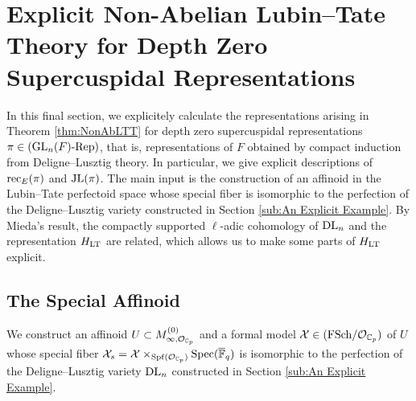 \documentclass[../main.tex]{subfiles}
\begin{document}
\section{Explicit Non-Abelian Lubin--Tate Theory for Depth Zero Supercuspidal
Representations} %
\label{sec:Explicit Non-Abelian Lubin-Tate Theory for Depth Zero Supercuspidal Representations}

In this final section, we explicitely calculate the representations
arising in Theorem \ref{thm:NonAbLTT} for depth zero supercuspidal
representations $\pi \in {({\operatorname{GL}_n(F)}\text-\allowbreak\mathrm{Rep})}$, that is, representations of $F$
obtained by compact induction from Deligne--Lusztig theory. In particular, 
we give explicit descriptions of $\mathrm{rec}_E(\pi)$ and $\mathrm{JL}(\pi)$. 
The main input is the construction of an affinoid in the Lubin--Tate perfectoid
space whose special fiber is isomorphic to the perfection of the 
Deligne--Lusztig variety constructed in Section \ref{sub:An Explicit Example}.
By Mieda's result, the compactly supported 
$\ell$-adic cohomology of $\mathrm{DL}_n$ and the representation $H_{\mathrm{LT}}$ are related,
which allows us to make some parts of $H_{\mathrm{LT}}$ explicit.

\subsection{The Special Affinoid} %
\label{sub:The Special Affinoid}
We construct an affinoid $U \subset M_{\infty,\mathcal{O}_{\mathbb{C}_p}}^{(0)}$ and a
formal model $\mathcal{X} \in {(\mathrm{FSch}/{\mathcal{O}_{\mathbb{C}_p}})}$ of $U$ whose special fiber $\mathcal{X}_s = 
\mathcal{X} \times_{\operatorname{Spf}(\mathcal{O}_{\mathbb{C}_p})}\operatorname{Spec}(\overline {\mathbb{F}}_q)$ is isomorphic to the perfection of the
Deligne--Lusztig variety $\mathrm{DL}_n$ constructed in Section \ref{sub:An Explicit Example}.

\end{document}
